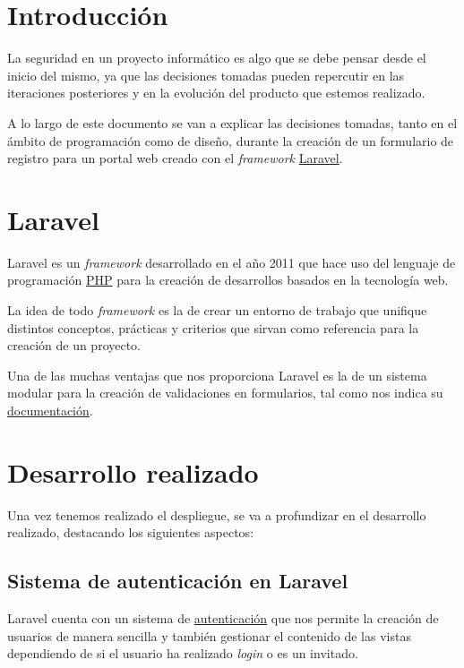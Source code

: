 \documentclass{\ClassPath/viu-tfm-template}
\begin{document}
\graphicspath{{../../VIU_TFM_LaTeX_template/}}

\coverpage

\tableofcontents

\chapter{Introducción}

La seguridad en un proyecto informático es algo que se debe pensar desde el inicio del mismo, ya que las decisiones tomadas pueden repercutir en las iteraciones posteriores y en la evolución del producto que estemos realizado.

A lo largo de este documento se van a explicar las decisiones tomadas, tanto en el ámbito de programación como de diseño, durante la creación de un formulario de registro para un portal web creado con el \textit{framework} \href{https://laravel.com/}{Laravel}.


\chapter{Laravel}

Laravel es un \textit{framework} desarrollado en el año 2011 que hace uso del lenguaje de programación \href{https://www.php.net/}{PHP} para la creación de desarrollos basados en la tecnología web.

La idea de todo \textit{framework} es la de crear un entorno de trabajo que unifique distintos conceptos, prácticas y criterios que sirvan como referencia para la creación de un proyecto.

Una de las muchas ventajas que nos proporciona Laravel es la de un sistema modular para la creación de validaciones en formularios, tal como nos indica su \href{https://laravel.com/docs/6.x/validation}{documentación}.


\chapter{Desarrollo realizado}

Una vez tenemos realizado el despliegue, se va a profundizar en el desarrollo realizado, destacando los siguientes aspectos:

\section{Sistema de autenticación en Laravel}
Laravel cuenta con un sistema de \href{https://laravel.com/docs/6.x/authentication}{autenticación} que nos permite la creación de usuarios de manera sencilla y también gestionar el contenido de las vistas dependiendo de si el usuario ha realizado \textit{login} o es un invitado.
\end{document}
